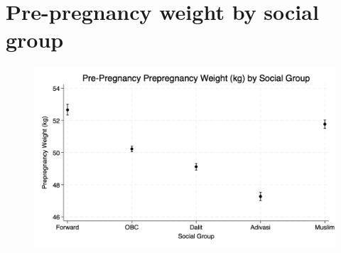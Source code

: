\documentclass{article}
\begin{document}
\section{Pre-pregnancy weight by social group}

\begin{figure}[H]
    \centering
    \includegraphics[width=\textwidth]{figures/bootstrapped_weight_by_group.png}
\end{figure}












\end{document}
